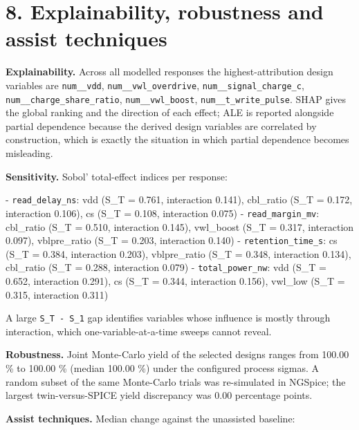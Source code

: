 \documentclass[conference]{IEEEtran}
\begin{document}








\section{8. Explainability, robustness and assist techniques}
\textbf{Explainability.} Across all modelled responses the highest-attribution design variables are \texttt{num\_\_vdd}, \texttt{num\_\_vwl\_overdrive}, \texttt{num\_\_signal\_charge\_c}, \texttt{num\_\_charge\_share\_ratio}, \texttt{num\_\_vwl\_boost}, \texttt{num\_\_t\_write\_pulse}. SHAP gives the global ranking and the direction of each effect; ALE is reported alongside partial dependence because the derived design variables are correlated by construction, which is exactly the situation in which partial dependence becomes misleading.

\textbf{Sensitivity.} Sobol' total-effect indices per response:

- \texttt{read\_delay\_ns}: vdd (S\_T = 0.761, interaction 0.141), cbl\_ratio (S\_T = 0.172, interaction 0.106), cs (S\_T = 0.108, interaction 0.075)
- \texttt{read\_margin\_mv}: cbl\_ratio (S\_T = 0.510, interaction 0.145), vwl\_boost (S\_T = 0.317, interaction 0.097), vblpre\_ratio (S\_T = 0.203, interaction 0.140)
- \texttt{retention\_time\_s}: cs (S\_T = 0.384, interaction 0.203), vblpre\_ratio (S\_T = 0.348, interaction 0.134), cbl\_ratio (S\_T = 0.288, interaction 0.079)
- \texttt{total\_power\_nw}: vdd (S\_T = 0.652, interaction 0.291), cs (S\_T = 0.344, interaction 0.156), vwl\_low (S\_T = 0.315, interaction 0.311)

A large \texttt{S\_T - S\_1} gap identifies variables whose influence is mostly through interaction, which one-variable-at-a-time sweeps cannot reveal.

\textbf{Robustness.} Joint Monte-Carlo yield of the selected designs ranges from 100.00 \% to 100.00 \% (median 100.00 \%) under the configured process sigmas.
 A random subset of the same Monte-Carlo trials was re-simulated in NGSpice; the largest twin-versus-SPICE yield discrepancy was 0.00 percentage points.

\textbf{Assist techniques.} Median change against the unassisted baseline:
\end{document}

